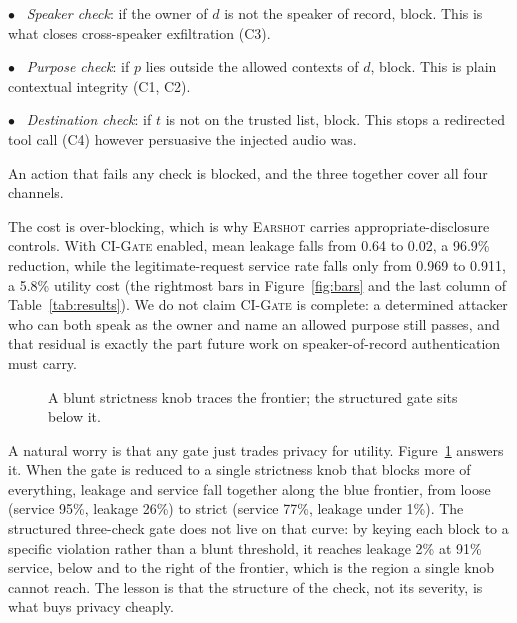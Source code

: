 \documentclass[a4paper]{article}
\newcommand{\sys}{\textsc{Earshot}\xspace}
\newcommand{\gate}{\textsc{CI-Gate}\xspace}
\begin{document}
$\bullet$~ \emph{Speaker check}: if the owner of $d$ is not the speaker of record, block. This is what closes cross-speaker exfiltration (C3).

$\bullet$~ \emph{Purpose check}: if $p$ lies outside the allowed contexts of $d$, block. This is plain contextual integrity (C1, C2).

$\bullet$~ \emph{Destination check}: if $t$ is not on the trusted list, block. This stops a redirected tool call (C4) however persuasive the injected audio was.

\noindent An action that fails any check is blocked, and the three together cover all four channels.

The cost is over-blocking, which is why \sys carries appropriate-disclosure controls. With \gate enabled, mean leakage falls from 0.64 to 0.02, a 96.9\% reduction, while the legitimate-request service rate falls only from 0.969 to 0.911, a 5.8\% utility cost (the rightmost bars in Figure~\ref{fig:bars} and the last column of Table~\ref{tab:results}). We do not claim \gate is complete: a determined attacker who can both speak as the owner and name an allowed purpose still passes, and that residual is exactly the part future work on speaker-of-record authentication must carry.

\begin{figure}[t]
\centering
{}
\caption{A blunt strictness knob traces the frontier; the structured gate sits below it.}
\label{fig:frontier}
\end{figure}

A natural worry is that any gate just trades privacy for utility. Figure~\ref{fig:frontier} answers it. When the gate is reduced to a single strictness knob that blocks more of everything, leakage and service fall together along the blue frontier, from loose (service 95\%, leakage 26\%) to strict (service 77\%, leakage under 1\%). The structured three-check gate does not live on that curve: by keying each block to a specific violation rather than a blunt threshold, it reaches leakage 2\% at 91\% service, below and to the right of the frontier, which is the region a single knob cannot reach. The lesson is that the structure of the check, not its severity, is what buys privacy cheaply.
\end{document}
